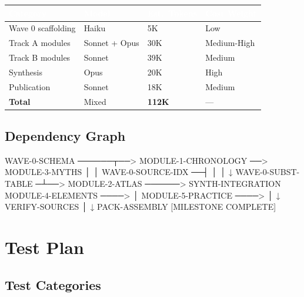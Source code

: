 \documentclass[11pt,letterpaper]{article}
\newcommand{\tableheader}[1]{\textbf{\sffamily\textcolor{white}{#1}}}
\begin{document}
\begin{center}
\begin{tabularx}{\textwidth}{L{4cm}C{2.5cm}C{2.5cm}C{2.5cm}}
\toprule
{}
\tableheader{Category} & \tableheader{Model} & \tableheader{Est.\ Tokens} & \tableheader{Cost Weight} \\
\midrule
Wave 0 scaffolding & Haiku & 5K & Low \\
Track A modules & Sonnet + Opus & 30K & Medium-High \\
Track B modules & Sonnet & 39K & Medium \\
Synthesis & Opus & 20K & High \\
Publication & Sonnet & 18K & Medium \\
\midrule
\textbf{Total} & Mixed & \textbf{112K} & --- \\
\bottomrule
\end{tabularx}
\end{center}

\subsection{Dependency Graph}

\begin{asciibox}
WAVE-0-SCHEMA ──────┬──> MODULE-1-CHRONOLOGY ──> MODULE-3-MYTHS
                    │                                    │
WAVE-0-SOURCE-IDX ──┤                                    │
                    │                                    ↓
WAVE-0-SUBST-TABLE ─┴──> MODULE-2-ATLAS ──────> SYNTH-INTEGRATION
                         MODULE-4-ELEMENTS ────>       │
                         MODULE-5-PRACTICE ────>       │
                                                        ↓
                                                  VERIFY-SOURCES
                                                        │
                                                        ↓
                                                  PACK-ASSEMBLY
                                                  [MILESTONE COMPLETE]
\end{asciibox}

\section{Test Plan}

\subsection{Test Categories}
\end{document}
